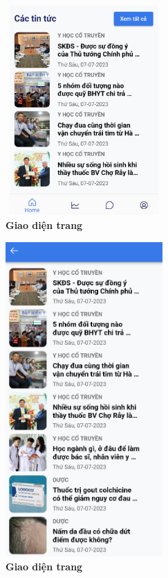 \begin{figure}[H]
  \centering
  \includegraphics[width=6cm,height=8cm]{Images/mobile_app/demo/preview_news.png}
  \caption[Giao diện trang]{\bfseries \fontsize{12pt}{0pt}\selectfont Giao diện trang}
  \label{demo_} %
\end{figure}

\begin{figure}[H]
  \centering
  \includegraphics[width=6cm,height=12cm]{Images/mobile_app/demo/all_news.png}
  \caption[Giao diện trang]{\bfseries \fontsize{12pt}{0pt}\selectfont Giao diện trang}
  \label{demo_} %
\end{figure}

